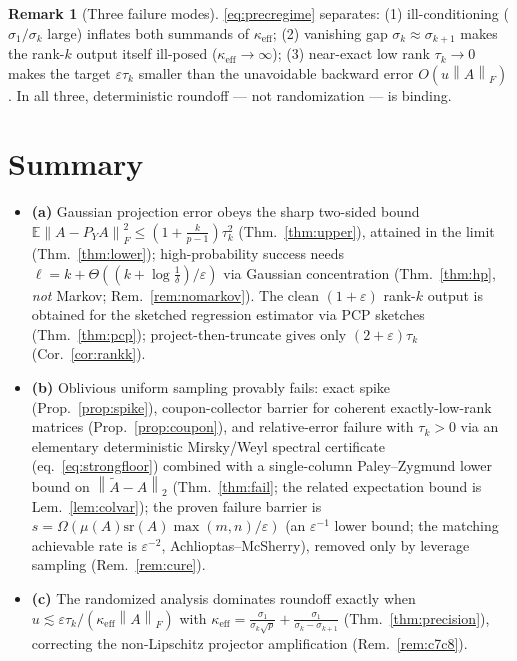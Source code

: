 \documentclass{amsart}
\theoremstyle{definition}
\newtheorem{remark}{Remark}
\newcommand{\Frob}[1]{\left\lVert #1\right\rVert_F}
\newcommand{\Op}[1]{\left\lVert #1\right\rVert_2}
\newcommand{\Atil}{\widetilde{A}}
\newcommand{\E}{\mathbb{E}}
\begin{document}
\begin{remark}[Three failure modes]
\eqref{eq:precregime} separates: (1) ill-conditioning ($\sigma_1/\sigma_k$
large) inflates both summands of $\kappa_{\mathrm{eff}}$; (2) vanishing gap
$\sigma_k\approx\sigma_{k+1}$ makes the rank-$k$ output itself ill-posed
($\kappa_{\mathrm{eff}}\to\infty$); (3) near-exact low rank $\tau_k\to0$ makes
the target $\varepsilon\tau_k$ smaller than the unavoidable backward error
$O(u\Frob A)$. In all three, deterministic roundoff --- not randomization --- is
binding.
\end{remark}

\section{Summary}

\begin{itemize}
\item \textbf{(a)} Gaussian projection error obeys the sharp two-sided bound
$\E\Frob{A-P_YA}^2\le(1+\tfrac k{p-1})\tau_k^2$ (Thm.~\ref{thm:upper}), attained
in the limit (Thm.~\ref{thm:lower}); high-probability success needs
$\ell=k+\Theta((k+\log\tfrac1\delta)/\varepsilon)$ via Gaussian concentration
(Thm.~\ref{thm:hp}, \emph{not} Markov; Rem.~\ref{rem:nomarkov}). The clean
$(1+\varepsilon)$ rank-$k$ output is obtained for the sketched regression
estimator via PCP sketches (Thm.~\ref{thm:pcp}); project-then-truncate gives only
$(2+\varepsilon)\tau_k$ (Cor.~\ref{cor:rankk}).
\item \textbf{(b)} Oblivious uniform sampling provably fails: exact spike
(Prop.~\ref{prop:spike}), coupon-collector barrier for coherent exactly-low-rank
matrices (Prop.~\ref{prop:coupon}), and relative-error failure with $\tau_k>0$
via an elementary deterministic Mirsky/Weyl spectral certificate
(eq.~\eqref{eq:strongfloor}) combined with a single-column Paley--Zygmund lower
bound on $\Op{\Atil-A}$ (Thm.~\ref{thm:fail}; the related expectation bound is
Lem.~\ref{lem:colvar}); the proven failure
barrier is $s=\Omega(\mu(A)\mathrm{sr}(A)\max(m,n)/\varepsilon)$ (an
$\varepsilon^{-1}$ lower bound; the matching achievable rate is
$\varepsilon^{-2}$, Achlioptas--McSherry), removed only by leverage sampling
(Rem.~\ref{rem:cure}).
\item \textbf{(c)} The randomized analysis dominates roundoff exactly when
$u\lesssim\varepsilon\tau_k/(\kappa_{\mathrm{eff}}\Frob A)$ with
$\kappa_{\mathrm{eff}}=\frac{\sigma_1}{\sigma_k\sqrt p}+\frac{\sigma_1}{\sigma_k-\sigma_{k+1}}$
(Thm.~\ref{thm:precision}), correcting the non-Lipschitz projector amplification
(Rem.~\ref{rem:c7c8}).
\end{itemize}
\end{document}
